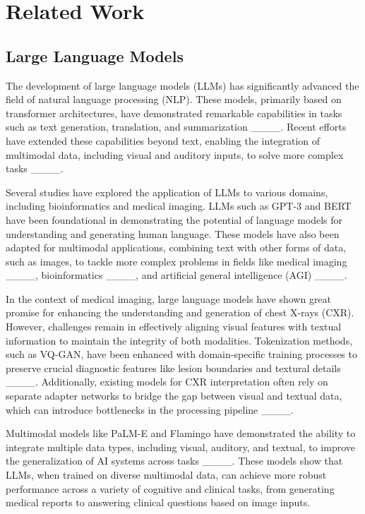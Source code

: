 \section{Related Work}
\subsection{Large Language Models}
The development of large language models (LLMs) has significantly advanced the field of natural language processing (NLP). These models, primarily based on transformer architectures, have demonstrated remarkable capabilities in tasks such as text generation, translation, and summarization ____. Recent efforts have extended these capabilities beyond text, enabling the integration of multimodal data, including visual and auditory inputs, to solve more complex tasks ____.

Several studies have explored the application of LLMs to various domains, including bioinformatics and medical imaging. LLMs such as GPT-3 and BERT have been foundational in demonstrating the potential of language models for understanding and generating human language. These models have also been adapted for multimodal applications, combining text with other forms of data, such as images, to tackle more complex problems in fields like medical imaging ____, bioinformatics ____, and artificial general intelligence (AGI) ____.

In the context of medical imaging, large language models have shown great promise for enhancing the understanding and generation of chest X-rays (CXR). However, challenges remain in effectively aligning visual features with textual information to maintain the integrity of both modalities. Tokenization methods, such as VQ-GAN, have been enhanced with domain-specific training processes to preserve crucial diagnostic features like lesion boundaries and textural details ____. Additionally, existing models for CXR interpretation often rely on separate adapter networks to bridge the gap between visual and textual data, which can introduce bottlenecks in the processing pipeline ____.

Multimodal models like PaLM-E and Flamingo have demonstrated the ability to integrate multiple data types, including visual, auditory, and textual, to improve the generalization of AI systems across tasks ____. These models show that LLMs, when trained on diverse multimodal data, can achieve more robust performance across a variety of cognitive and clinical tasks, from generating medical reports to answering clinical questions based on image inputs.

